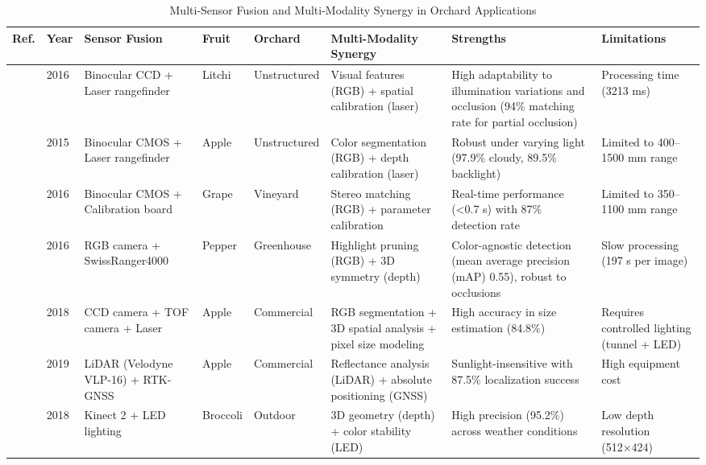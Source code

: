 \documentclass[pdflatex,sn-mathphys-num]{sn-jnl}
\begin{document}
\begin{table}[ht]
\small
\centering
\caption{Multi-Sensor Fusion and Multi-Modality Synergy in Orchard Applications} 
\label{tab:dataset}
\renewcommand{\arraystretch}{1.4}
\begin{tabular}{p{1.2cm}p{0.8cm}p{2.5cm}p{1cm}p{1.3cm}p{3cm}p{4cm}p{2.5cm}}
\hline
\textbf{Ref.} & \textbf{Year} & \textbf{Sensor Fusion} & \textbf{Fruit} & \textbf{Orchard} & \textbf{Multi-Modality Synergy} & \textbf{Strengths} & \textbf{Limitations} \\ 
\hline
\cite{wang2016localisation} & 2016 & Binocular CCD + Laser rangefinder & Litchi & Unstructured & Visual features (RGB) + spatial calibration (laser) & High adaptability to illumination variations and occlusion (94\% matching rate for partial occlusion) & Processing time (3213 ms) \\ 
\hline
\cite{si2015location} & 2015 & Binocular CMOS + Laser rangefinder & Apple & Unstructured & Color segmentation (RGB) + depth calibration (laser) & Robust under varying light (97.9\% cloudy, 89.5\% backlight) & Limited to 400–1500 mm range  \\ 
\hline
\cite{luo2016vision} & 2016 & Binocular CMOS + Calibration board & Grape & Vineyard & Stereo matching (RGB) + parameter calibration & Real-time performance (<0.7 s) with 87\% detection rate & Limited to 350–1100 mm range  \\ 
\hline
\cite{barnea2016colour} & 2016 & RGB camera + SwissRanger4000 & Pepper & Greenhouse & Highlight pruning (RGB) + 3D symmetry (depth) & Color-agnostic detection (mean average precision (mAP) 0.55), robust to occlusions & Slow processing (197 s per image)  \\ 
\hline
\cite{gongal2018apple} & 2018 & CCD camera + TOF camera + Laser & Apple & Commercial & RGB segmentation + 3D spatial analysis + pixel size modeling & High accuracy in size estimation (84.8\%) & Requires controlled lighting (tunnel + LED) \\ 
\hline
\cite{gene2019fruit} & 2019 & LiDAR (Velodyne VLP-16) + RTK-GNSS & Apple & Commercial & Reflectance analysis (LiDAR) + absolute positioning (GNSS) & Sunlight-insensitive with 87.5\% localization success & High equipment cost  \\ 
\hline
\cite{kusumam20173d} & 2018 & Kinect 2 + LED lighting & Broccoli & Outdoor & 3D geometry (depth) + color stability (LED) & High precision (95.2\%) across weather conditions & Low depth resolution (512×424)  \\ 

\end{tabular}
\end{table}
\end{document}
